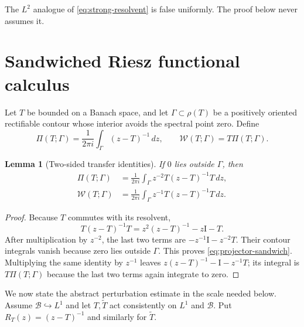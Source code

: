 \documentclass[11pt]{article}
\newtheorem{lemma}[theorem]{Lemma}
\theoremstyle{remark}
\newcommand{\Id}{\mathrm I}
\newcommand{\cB}{\mathcal B}
\newcommand{\cW}{\mathcal W}
\begin{document}
The $L^2$ analogue of \eqref{eq:strong-resolvent} is false uniformly.  The
proof below never assumes it.

\section{Sandwiched Riesz functional calculus}

Let $T$ be bounded on a Banach space, and let $\Gamma\subset\rho(T)$ be a
positively oriented rectifiable contour whose interior avoids the spectral
point zero.  Define
\[
 \Pi(T;\Gamma)=\frac1{2\pi i}\int_\Gamma(z-T)^{-1}\,dz,
 \qquad
 \cW(T;\Gamma)=T\Pi(T;\Gamma).
\]

\begin{lemma}[Two-sided transfer identities]
\label{lem:sandwich-identities}
If $0$ lies outside $\Gamma$, then
\begin{align}
 \Pi(T;\Gamma)
 &=\frac1{2\pi i}\int_\Gamma
 z^{-2}T(z-T)^{-1}T\,dz,
 \label{eq:projector-sandwich}\\
 \cW(T;\Gamma)
 &=\frac1{2\pi i}\int_\Gamma
 z^{-1}T(z-T)^{-1}T\,dz.
 \label{eq:weighted-sandwich}
\end{align}
\end{lemma}

\begin{proof}
Because $T$ commutes with its resolvent,
\[
 T(z-T)^{-1}T=z^2(z-T)^{-1}-z\Id-T.
\]
After multiplication by $z^{-2}$, the last two terms are
$-z^{-1}\Id-z^{-2}T$.  Their contour integrals vanish because zero lies
outside $\Gamma$.  This proves \eqref{eq:projector-sandwich}.  Multiplying
the same identity by $z^{-1}$ leaves
$z(z-T)^{-1}-\Id-z^{-1}T$; its integral is
$T\Pi(T;\Gamma)$ because the last two terms again integrate to zero.
\end{proof}

We now state the abstract perturbation estimate in the scale needed below.
Assume $\cB\hookrightarrow L^1$ and let $T,\widetilde T$ act consistently on
$L^1$ and $\cB$.  Put $R_T(z)=(z-T)^{-1}$ and similarly for
$\widetilde T$.
\end{document}
